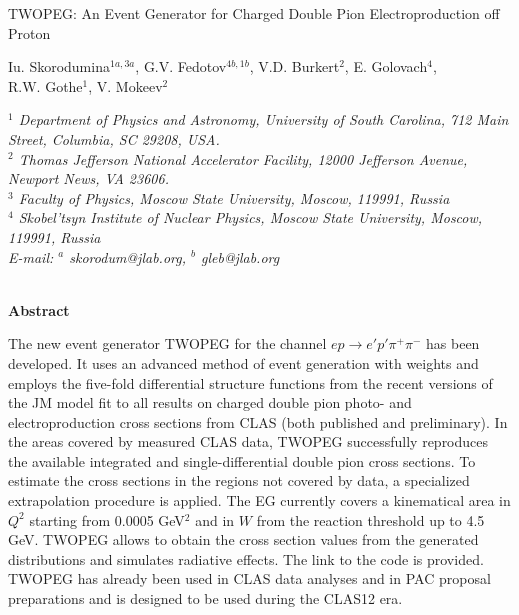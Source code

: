 \noindent\begin{minipage}{\textwidth}
\begin{center}
\thispagestyle{empty}
\vspace{0.5cm}
{ \Large{TWOPEG: An Event Generator for Charged Double Pion Electroproduction off Proton}}\\
\vspace{1cm}

{\large Iu. Skorodumina$^{1a, 3a}$, G.V. Fedotov$^{4b, 1b}$, V.D. Burkert$^{2}$, E. Golovach$^{4}$,\\ R.W. Gothe$^{1}$, V. Mokeev$^{2}$}\\[6pt]

\parbox{.86\textwidth}{\centering\small\it
$^1$ Department of Physics and Astronomy, University of South Carolina, 712 Main Street, Columbia, SC 29208, USA.\\
$^2$ Thomas Jefferson National Accelerator Facility, 12000 Jefferson Avenue, Newport News, VA 23606.\\
$^3$ Faculty of Physics, Moscow State University, Moscow, 119991, Russia\\
$^4$ Skobel'tsyn Institute of Nuclear Physics, Moscow State University, Moscow, 119991, Russia\\
E-mail: $^a$ skorodum@jlab.org, $^b$ gleb@jlab.org}\\


\vspace{2cm}
{\bf Abstract}\\[9pt]

\end{center}
{The new event generator TWOPEG for the channel $e p \rightarrow e' p' \pi^{+} \pi^{-}$ has been developed. It uses an advanced method of event generation with weights and employs the five-fold differential structure functions from the recent versions of the JM model fit to all results on charged double pion photo- and electroproduction cross sections from CLAS (both published and preliminary). In the areas covered by measured CLAS data, TWOPEG successfully reproduces the available integrated and single-differential double pion cross sections. To estimate the cross sections in the regions not covered by data, a specialized extrapolation procedure is applied. The EG currently covers a kinematical area in $Q^2$ starting from 0.0005 GeV$^2$ and in $W$ from the reaction threshold up to 4.5 GeV. TWOPEG allows to obtain the cross section values from the generated distributions and simulates radiative effects. The link to the code is provided. TWOPEG has already been used in CLAS data analyses and in PAC proposal preparations and is designed to be used during the CLAS12 era.}



\end{minipage}
